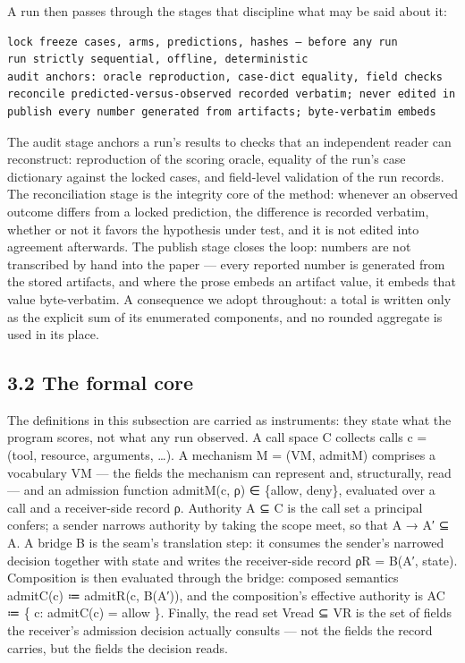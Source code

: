 \documentclass[
  10pt,
]{article}
\renewcommand{\_}{\origunderscore\allowbreak}
\begin{document}
A run then passes through the stages that discipline what may be said
about it:

\begin{verbatim}
lock freeze cases, arms, predictions, hashes — before any run
run strictly sequential, offline, deterministic
audit anchors: oracle reproduction, case-dict equality, field checks
reconcile predicted-versus-observed recorded verbatim; never edited in
publish every number generated from artifacts; byte-verbatim embeds
\end{verbatim}

The audit stage anchors a run's results to checks that an independent
reader can reconstruct: reproduction of the scoring oracle, equality of
the run's case dictionary against the locked cases, and field-level
validation of the run records. The reconciliation stage is the integrity
core of the method: whenever an observed outcome differs from a locked
prediction, the difference is recorded verbatim, whether or not it
favors the hypothesis under test, and it is not edited into agreement
afterwards. The publish stage closes the loop: numbers are not
transcribed by hand into the paper --- every reported number is
generated from the stored artifacts, and where the prose embeds an
artifact value, it embeds that value byte-verbatim. A consequence we
adopt throughout: a total is written only as the explicit sum of its
enumerated components, and no rounded aggregate is used in its place.

\subsection{3.2 The formal core}\label{the-formal-core}

The definitions in this subsection are carried as instruments: they
state what the program scores, not what any run observed. A call space C
collects calls c = (tool, resource, arguments, \ldots). A mechanism M =
(V\_M, admit\_M) comprises a vocabulary V\_M --- the fields the
mechanism can represent and, structurally, read --- and an admission
function admit\_M(c, ρ) ∈ \{allow, deny\}, evaluated over a call and a
receiver-side record ρ. Authority A ⊆ C is the call set a principal
confers; a sender narrows authority by taking the scope meet, so that A
→ A′ ⊆ A. A bridge B is the seam's translation step: it consumes the
sender's narrowed decision together with state and writes the
receiver-side record ρ\_R = B(A′, state). Composition is then evaluated
through the bridge: composed semantics admit\_C(c) ≔ admit\_R(c, B(A′)),
and the composition's effective authority is A\_C ≔ \{ c: admit\_C(c) =
allow \}. Finally, the read set V\_read ⊆ V\_R is the set of fields the
receiver's admission decision actually consults --- not the fields the
record carries, but the fields the decision reads.
\end{document}
